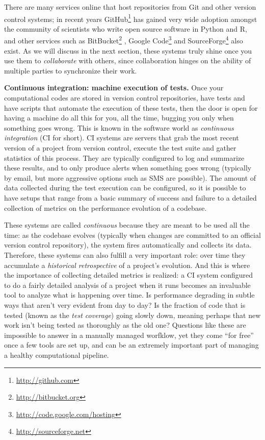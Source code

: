 \documentclass[ChapterTOCs,krantz2]{krantz} %
\newcommand{\blockpar}[1]{\vspace*{3mm} \noindent \textbf{#1}}
\begin{document}
There are many services online that host repositories from Git and other
version control systems; in recent years
GitHub\footnote{\url{http://github.com}} has gained very wide adoption amongst
the community of scientists who write open source software in Python and R, and
other services such as BitBucket\footnote{\url{http://bitbucket.org}} ,
Google Code\footnote{\url{http://code.google.com/hosting}} and
SourceForge\footnote{\url{http://sourceforge.net}} also exist.  As we will
discuss in the next section, these systems truly shine once you use them to
\emph{collaborate} with others, since collaboration hinges on the ability of
multiple parties to synchronize their work.

\blockpar{Continuous integration: machine execution of tests.} Once your
computational codes are stored in version control repositories, have tests and
have scripts that automate the execution of these tests, then the door is open
for having a machine do all this for you, all the time, bugging you only when
something goes wrong.  This is known in the software world as \emph{continuous
  integration} (CI for short). CI systems are servers that grab the most recent
version of a project from version control, execute the test suite and gather
statistics of this process.  They are typically configured to log and summarize
these results, and to only produce alerts when something goes wrong (typically
by email, but more aggressive options such as SMS are possible).  The amount of
data collected during the test execution can be configured, so it is possible
to have setups that range from a basic summary of success and failure to a
detailed collection of metrics on the performance evolution of a codebase.

These systems are called \emph{continuous} because they are meant to be used
all the time: as the codebase evolves (typically when changes are committed to
an official version control repository), the system fires automatically and
collects its data.  Therefore, these systems can also fulfill a very important
role: over time they accumulate a \emph{historical retrospective} of a
project's evolution.  And this is where the importance of collecting detailed
metrics is realized: a CI system configured to do a fairly detailed analysis of
a project when it runs becomes an invaluable tool to analyze what is happening
over time.  Is performance degrading in subtle ways that aren't very evident
from day to day? Is the fraction of code that is tested (known as the
\emph{test coverage}) going slowly down, meaning perhaps that new work isn't
being tested as thoroughly as the old one?  Questions like these are impossible
to answer in a manually managed worfklow, yet they come ``for free'' once a few
tools are set up, and can be an extremely important part of managing a healthy
computational pipeline.
\end{document}
